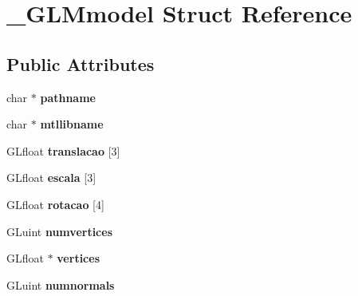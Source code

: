 \hypertarget{struct__GLMmodel}{\section{\-\_\-\-G\-L\-Mmodel \-Struct \-Reference}
\label{struct__GLMmodel}
}
\subsection*{\-Public \-Attributes}
\begin{DoxyCompactItemize}
\item 
\hypertarget{struct__GLMmodel_a06f09c6f9c93cec84232e848a0ce1b2b}{char $\ast$ {\bfseries pathname}}\label{struct__GLMmodel_a06f09c6f9c93cec84232e848a0ce1b2b}

\item 
\hypertarget{struct__GLMmodel_ab36e68f85a3764bfccf971d8b5ed26df}{char $\ast$ {\bfseries mtllibname}}\label{struct__GLMmodel_ab36e68f85a3764bfccf971d8b5ed26df}

\item 
\hypertarget{struct__GLMmodel_a3046f34ee33ad43511caf373b9f521b1}{\-G\-Lfloat {\bfseries translacao} \mbox{[}3\mbox{]}}\label{struct__GLMmodel_a3046f34ee33ad43511caf373b9f521b1}

\item 
\hypertarget{struct__GLMmodel_ad0d399f66264edace0a0d77b038a510a}{\-G\-Lfloat {\bfseries escala} \mbox{[}3\mbox{]}}\label{struct__GLMmodel_ad0d399f66264edace0a0d77b038a510a}

\item 
\hypertarget{struct__GLMmodel_affd92886dd228ff700e3eadf004957de}{\-G\-Lfloat {\bfseries rotacao} \mbox{[}4\mbox{]}}\label{struct__GLMmodel_affd92886dd228ff700e3eadf004957de}

\item 
\hypertarget{struct__GLMmodel_ad74d64597f256d85581f1c76a1e82243}{\-G\-Luint {\bfseries numvertices}}\label{struct__GLMmodel_ad74d64597f256d85581f1c76a1e82243}

\item 
\hypertarget{struct__GLMmodel_accb67311836e00c90c63e826fa58afe1}{\-G\-Lfloat $\ast$ {\bfseries vertices}}\label{struct__GLMmodel_accb67311836e00c90c63e826fa58afe1}

\item 
\hypertarget{struct__GLMmodel_ab6ab634af259da990dd343da8bb97d60}{\-G\-Luint {\bfseries numnormals}}\label{struct__GLMmodel_ab6ab634af259da990dd343da8bb97d60}


\end{DoxyCompactItemize}
